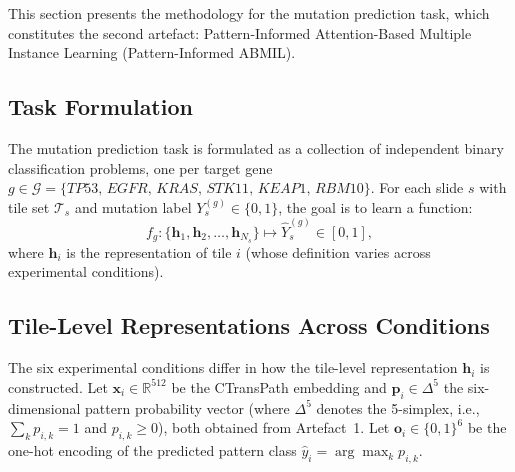This section presents the methodology for the mutation prediction task, which constitutes the second artefact: Pattern-Informed Attention-Based Multiple Instance Learning (Pattern-Informed ABMIL).

\subsection{Task Formulation}
\label{sec:meth:mutation:task}

The mutation prediction task is formulated as a collection of independent binary classification problems, one per target gene $g \in \mathcal{G} = \{\textit{TP53},\allowbreak\, \textit{EGFR},\allowbreak\, \textit{KRAS},\allowbreak\, \textit{STK11},\allowbreak\, \textit{KEAP1},\allowbreak\, \textit{RBM10}\}$.
For each slide $s$ with tile set $\mathcal{T}_s$ and mutation label $Y_s^{(g)} \in \{0, 1\}$, the goal is to learn a function:
\begin{equation}
\label{eq:mutation_task}
f_g: \{\mathbf{h}_1, \mathbf{h}_2, \ldots, \mathbf{h}_{N_s}\} \mapsto \hat{Y}_s^{(g)} \in [0, 1],
\end{equation}
where $\mathbf{h}_i$ is the representation of tile $i$ (whose definition varies across experimental conditions).

\subsection{Tile-Level Representations Across Conditions}
\label{sec:meth:mutation:representations}

The six experimental conditions differ in how the tile-level representation $\mathbf{h}_i$ is constructed.
Let $\mathbf{x}_i \in \mathbb{R}^{512}$ be the CTransPath embedding and $\mathbf{p}_i \in \Delta^5$ the six-dimensional pattern probability vector (where $\Delta^5$ denotes the 5-simplex, i.e., $\sum_k p_{i,k} = 1$ and $p_{i,k} \geq 0$), both obtained from Artefact~1.
Let $\mathbf{o}_i \in \{0,1\}^6$ be the one-hot encoding of the predicted pattern class $\hat{y}_i = \arg\max_k p_{i,k}$.

